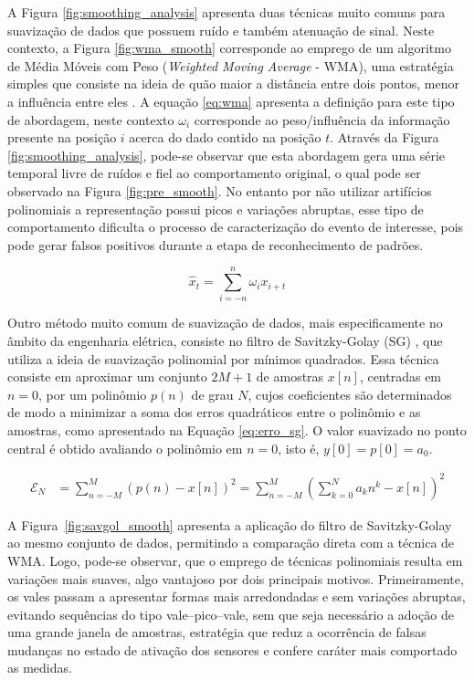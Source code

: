 A Figura \ref{fig:smoothing_analysis} apresenta duas técnicas muito comuns para suavização de dados que possuem ruído e também atenuação de sinal. Neste contexto, a Figura \ref{fig:wma_smooth} corresponde ao emprego de um algoritmo de Média Móveis com Peso (\textit{Weighted Moving Average} - WMA), uma estratégia simples que consiste na ideia de quão maior a distância entre dois pontos, menor a influência entre eles \cite{wang_time_2020}. A equação \ref{eq:wma} apresenta a definição para este tipo de abordagem, neste contexto $\omega_i$ corresponde ao peso/influência da informação presente na posição $i$ acerca do dado contido na posição $t$. Através da Figura \ref{fig:smoothing_analysis}, pode-se observar que esta abordagem gera uma série temporal livre de ruídos e fiel ao comportamento original, o qual pode ser observado na Figura \ref{fig:pre_smooth}. No entanto por não utilizar artifícios polinomiais a representação possui picos e variações abruptas, esse tipo de comportamento dificulta o processo de caracterização do evento de interesse, pois pode gerar falsos positivos durante a etapa de reconhecimento de padrões.

\begin{equation}
\hat{x}_t = \sum_{i=-n}^{n} \omega_i x_{i+t}
\label{eq:wma}
\end{equation}

Outro método muito comum de suavização de dados, mais especificamente no âmbito da engenharia elétrica, consiste no filtro de Savitzky-Golay (SG) \cite{schafer_what_2011}, que utiliza a ideia de suavização polinomial por mínimos quadrados. Essa técnica consiste em aproximar um conjunto $2M + 1$ de amostras $x[n]$, centradas em $n=0$, por um polinômio $p(n)$ de grau $N$, cujos coeficientes são determinados de modo a minimizar a soma dos erros quadráticos entre o polinômio e as amostras, como apresentado na Equação \ref{eq:erro_sg}. O valor suavizado no ponto central é obtido avaliando o polinômio em $n = 0$, isto é, $y[0]=p[0]=a_0$.

\begin{equation}
\begin{aligned}
\mathcal{E}_N 
&= \sum_{n=-M}^{M} \left( p(n) - x[n] \right)^2 = \sum_{n=-M}^{M} \left( \sum_{k=0}^{N} a_k n^k - x[n] \right)^2
\end{aligned}
\label{eq:erro_sg}
\end{equation}

A Figura~\ref{fig:savgol_smooth} apresenta a aplicação do filtro de Savitzky-Golay ao mesmo conjunto de dados, permitindo a comparação direta com a técnica de WMA. Logo, pode-se observar, que o emprego de técnicas polinomiais resulta em variações mais suaves, algo vantajoso por dois principais motivos. Primeiramente, os vales passam a apresentar formas mais arredondadas e sem variações abruptas, evitando sequências do tipo vale–pico–vale, sem que seja necessário a adoção de uma grande janela de amostras, estratégia que reduz a ocorrência de falsas mudanças no estado de ativação dos sensores e confere caráter mais comportado as medidas. 

